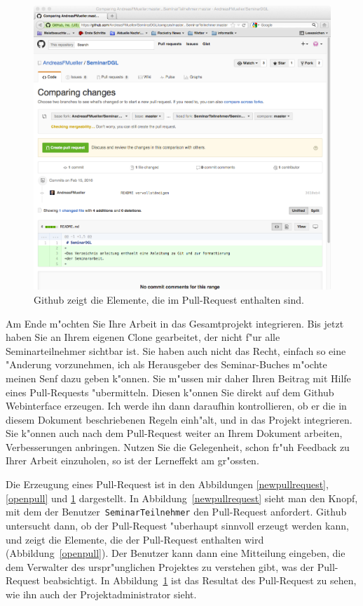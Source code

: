 \documentclass[a4paper,12pt]{article}
\begin{document}
\begin{figure}
\centering
\includegraphics[width=\hsize]{preparepullrequest.png}
\caption{Github zeigt die Elemente, die im Pull-Request enthalten sind.
\label{pullresult}}
\end{figure}
Am Ende m"ochten Sie Ihre Arbeit in das Gesamtprojekt integrieren.
Bis jetzt haben Sie an Ihrem eigenen Clone gearbeitet, der nicht f"ur
alle Seminarteilnehmer sichtbar ist.
Sie haben auch nicht das Recht, einfach so eine "Anderung vorzunehmen,
ich als Herausgeber des Seminar-Buches m"ochte meinen Senf dazu geben
k"onnen.
Sie m"ussen mir daher Ihren Beitrag mit Hilfe eines Pull-Requests
"ubermitteln.
Diesen k"onnen Sie direkt auf dem Github Webinterface erzeugen.
Ich werde ihn dann daraufhin kontrollieren, ob er die in diesem
Dokument beschriebenen Regeln einh"alt, und in das Projekt
integrieren.
Sie k"onnen auch nach dem Pull-Request weiter an Ihrem Dokument
arbeiten, Verbesserungen anbringen.
Nutzen Sie die Gelegenheit, schon fr"uh Feedback zu Ihrer Arbeit
einzuholen, so ist der Lerneffekt am gr"ossten.

Die Erzeugung eines Pull-Request ist in den Abbildungen
\ref{newpullrequest},
\ref{openpull}
und
\ref{pullresult} dargestellt.
In Abbildung~\ref{newpullrequest} sieht man den Knopf, mit dem der
Benutzer~\texttt{SeminarTeilnehmer} den Pull-Request anfordert.
Github untersucht dann, ob der Pull-Request "uberhaupt sinnvoll
erzeugt werden kann, und zeigt die Elemente, die der
Pull-Request enthalten wird (Abbildung~\ref{openpull}).
Der Benutzer kann dann eine Mitteilung eingeben, die dem Verwalter
des urspr"unglichen Projektes zu verstehen gibt, was der Pull-Request
beabsichtigt.
In Abbildung~\ref{pullresult} ist das Resultat des Pull-Request zu
sehen, wie ihn auch der Projektadministrator sieht.
\end{document}
